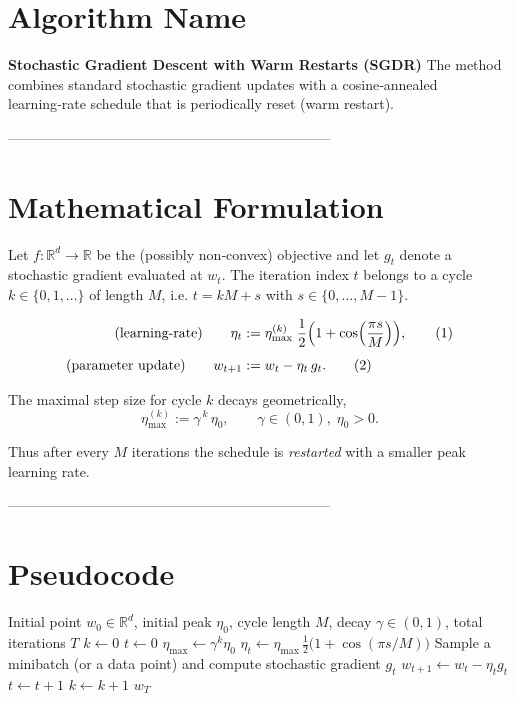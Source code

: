 \documentclass{article}
\newcommand{\R}{\mathbb{R}}
\begin{document}
\section*{Algorithm Name}
\textbf{Stochastic Gradient Descent with Warm Restarts (SGDR)}  
The method combines standard stochastic gradient updates with a cosine‑annealed
learning‑rate schedule that is periodically reset (warm restart).  

---------------------------------------------------------------------

\section*{Mathematical Formulation}
Let $f:\R^{d}\rightarrow\R$ be the (possibly non‑convex) objective and let
$g_t$ denote a stochastic gradient evaluated at $w_t$.
The iteration index $t$ belongs to a cycle $k\in\{0,1,\dots\}$ of length $M$,
i.e. $t = kM + s$ with $s\in\{0,\dots ,M-1\}$.

\begin{align}
\text{(learning‑rate)}\qquad 
\eta_t &:= \eta_{\max}^{(k)}\;\frac{1}{2}\Bigl(1+\cos\Bigl(\frac{\pi s}{M}\Bigr)\Bigr), \tag{1}\\[4pt]
\text{(parameter update)}\qquad 
w_{t+1} &:= w_t - \eta_t\, g_t . \tag{2}
\end{align}

The maximal step size for cycle $k$ decays geometrically,
\[
\eta_{\max}^{(k)}:=\gamma^{\,k}\,\eta_0 ,\qquad 
\gamma\in(0,1),\;\eta_0>0 . \tag{3}
\]

Thus after every $M$ iterations the schedule is \emph{restarted}
with a smaller peak learning rate.

---------------------------------------------------------------------

\section*{Pseudocode}
\begin{algorithm}[H]
\caption{SGDR}
\begin{algorithmic}[1]
\Require Initial point $w_0\in\R^{d}$, initial peak $\eta_0$, cycle length $M$, decay $\gamma\in(0,1)$, total iterations $T$
\State $k\gets 0$ 
\State $t\gets 0$
    \State $\eta_{\max}\gets \gamma^{k}\eta_0$
        \State $\eta_t \gets \eta_{\max}\,\frac{1}{2}\bigl(1+\cos(\pi s/M)\bigr)$
        \State Sample a minibatch (or a data point) and compute stochastic gradient $g_t$
        \State $w_{t+1}\gets w_t-\eta_t g_t$
        \State $t\gets t+1$
    \EndFor
    \State $k\gets k+1$ 
\EndWhile
\State \Return $w_T$
\end{algorithmic}
\end{algorithm}
\end{document}
